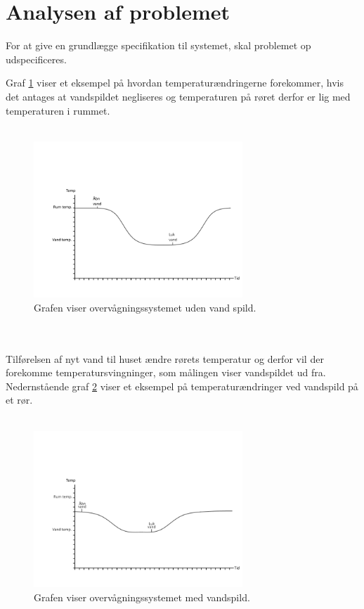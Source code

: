 \section{Analysen af problemet}

For at give en grundlægge specifikation til systemet, skal problemet op udspecificeres.  

Graf \ref{vandspild_graf_normal} viser et eksempel på hvordan temperaturændringerne forekommer, hvis det antages at vandspildet negliseres og temperaturen på røret derfor er lig med temperaturen i rummet.   
\\
\\
\begin{figure}[h!]
  \centering
  \includegraphics[width=0.7\textwidth]{figures/vandspild_graf_normal.png}
  \caption{Grafen viser overvågningssystemet uden vand spild.}
  \label{vandspild_graf_normal}
\end{figure}
\\
\\
Tilførelsen af nyt vand til huset ændre rørets temperatur og derfor vil der forekomme temperatursvingninger, som målingen viser vandspildet ud fra. Nedernstående graf \ref{vandspild_graf_spild} viser et eksempel på temperaturændringer ved vandspild på et rør.
\\
\\
\begin{figure}[h!]
  \centering
  \includegraphics[width=0.7\textwidth]{figures/vandspild_graf_spild.png}
  \caption{Grafen viser overvågningssystemet med vandspild.}
  \label{vandspild_graf_spild}
\end{figure}
